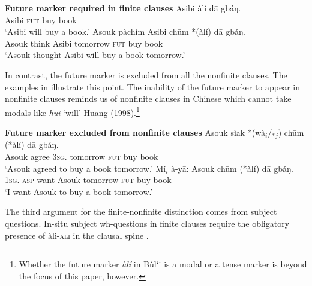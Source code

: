 \documentclass[output=paper,colorlinks,citecolor=brown]{langscibook}
\begin{document}
\ea%
    \label{ex:sulemana:8}
    {\bf{Future marker required in finite clauses}}
    \ea%
    \label{ex:sulemana:8a}
    \gll    Asibi àlí dā gbáŋ.\\
            Asibi \textsc{fut} buy book\\
    \glt    `Asibi will buy a book.'
    \ex%
    \label{ex:sulemana:8b}
    \gll    Asouk pàchìm Asibi chūm *(àlí) dā gbáŋ.\\
            Asouk think Asibi tomorrow \textsc{fut}  buy book\\
    \glt    `Asouk thought Asibi will buy a book tomorrow.' 
    \z
\z

In contrast, the future marker is excluded from all the nonfinite clauses. The examples in  illustrate this point. The inability of the future marker to appear in nonfinite clauses reminds us of nonfinite clauses in Chinese which cannot take modals like {\it{hui}} `will' Huang (1998).\footnote{Whether the future marker {\it{àlí}} in Bùl`i is a modal or a tense marker is beyond the focus of this paper, however.} 

\ea%
    \label{ex:sulemana:9}
    {\bf{Future marker excluded from nonfinite clauses}}
    \ea%
    \label{ex:sulemana:9a}
    \gll    Asouk sìak *(wà$_i$/$_*${}$_j$) chūm (*àlí) dā gbáŋ.\\
            Asouk agree \textsc{3sg}. tomorrow \textsc{fut} buy book\\
    \glt    `Asouk agreed to buy a book tomorrow.'
    \ex%
    \label{ex:sulemana:9b}
    \gll    Mí$_i$ à-yā: Asouk chūm (*àlí) dā gbáŋ.\\
            \textsc{1sg}. \textsc{asp}-want Asouk  tomorrow \textsc{fut}  buy book\\
    \glt    `I want Asouk to buy a book tomorrow.' 
    \z
\z

The third argument for the finite-nonfinite distinction comes from subject questions. In-situ subject wh-questions in finite clauses require the obligatory presence of {àlì-\textsc{ali}} in the clausal spine . 
\end{document}
